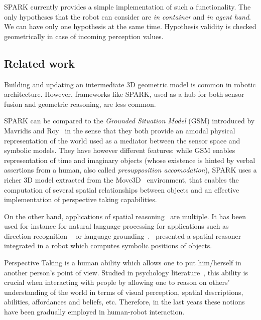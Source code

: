 \documentclass{svmult}
\begin{document}
SPARK currently provides a simple implementation of such a functionality. The
only hypotheses that the robot can consider are \emph{in container} and
\emph{in agent hand}. We can have only one hypothesis at the same time.
Hypothesis validity is checked geometrically in case of incoming perception
values.

\subsection{Related work}

Building and updating an intermediate 3D geometric model is common in robotic
architecture. However, frameworks like SPARK, used as a hub for both sensor
fusion and geometric reasoning, are less common.

SPARK can be compared to the \emph{Grounded Situation Model} (GSM) introduced
by Mavridis and Roy~\cite{Mavridis2005} in the sense that they both provide an
amodal physical representation of the world used as a mediator between the
sensor space and symbolic models. They have however different features: while
GSM enables representation of time and imaginary objects (whose existence is
hinted by verbal assertions from a human, also called \emph{presupposition
accomodation}), SPARK uses a richer 3D model extracted from the
Move3D~\cite{Simeon2001} environment, that enables the computation of several
spatial relationships between objects and an effective implementation of
perspective taking capabilities.

On the other hand, applications of spatial reasoning~\cite{O'Keefe1999} are
multiple. It has been used for instance for natural language processing for
applications such as direction recognition ~\cite{Kollar2010,Matuszek2010} or
language grounding~\cite{Tellex2010}.~\cite{Skubic2004} presented a spatial
reasoner integrated in a robot which computes symbolic positions of objects.

Perspective Taking is a human ability which allows one to put him/herself in
another person's point of view. Studied in psychology
literature~\cite{Flavell1992,Tversky1999}, this ability is crucial when
interacting with people by allowing one to reason on others' understanding of
the world in terms of visual perception, spatial descriptions, abilities,
affordances and beliefs, etc.  Therefore, in the last years these notions have
been gradually employed in human-robot interaction.



\end{document}
